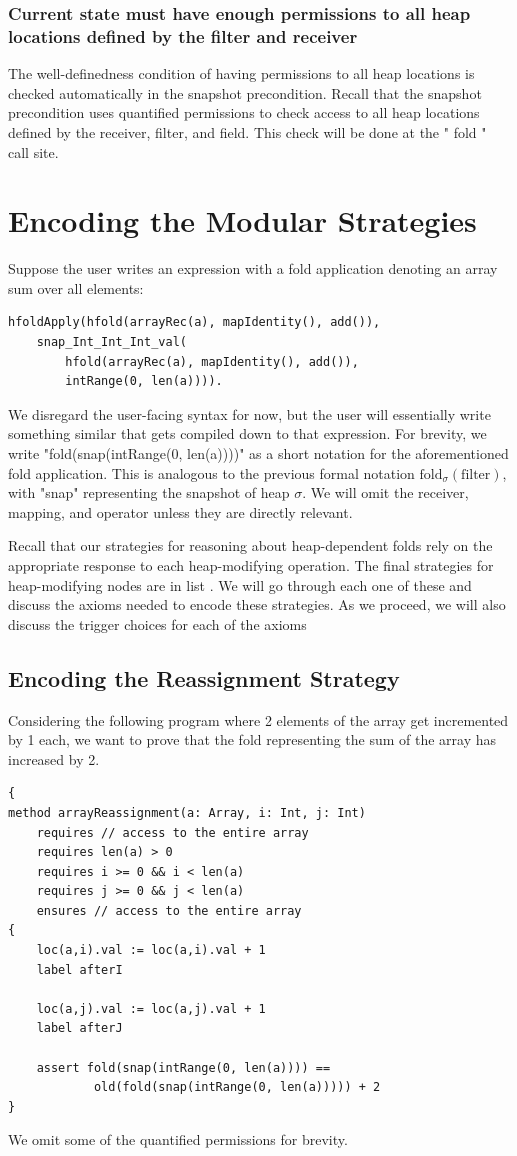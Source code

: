 \documentclass[msc,oneside]{ubcthesis}
\theoremstyle{definition}
\begin{document}
\subsubsection{Current state must have enough permissions to all heap locations defined by the filter and receiver}
The well-definedness condition of having permissions to all heap locations is checked automatically in the snapshot precondition. Recall that the snapshot precondition uses quantified permissions to check access to all heap locations defined by the receiver, filter, and field. This check will be done at the " fold " call site.

\section{Encoding the Modular Strategies}
Suppose the user writes an expression with a fold application denoting an array sum over all elements: 
\begin{lstlisting}
hfoldApply(hfold(arrayRec(a), mapIdentity(), add()),
    snap_Int_Int_Int_val(
        hfold(arrayRec(a), mapIdentity(), add()), 
        intRange(0, len(a)))).
\end{lstlisting}
We disregard the user-facing syntax for now, but the user will essentially write something similar that gets compiled down to that expression. For brevity, we write "fold(snap(intRange(0, len(a))))" as a short notation for the aforementioned fold application. This is analogous to the previous formal notation $\textrm{fold}_\sigma(\textrm{filter})$, with "snap" representing the snapshot of heap $\sigma$.  We will omit the receiver, mapping, and operator unless they are directly relevant. 

Recall that our strategies for reasoning about heap-dependent folds rely on the appropriate response to each heap-modifying operation. The final strategies for heap-modifying nodes are in list .
We will go through each one of these and discuss the axioms needed to encode these strategies. As we proceed, we will also discuss the trigger choices for each of the axioms

\subsection{Encoding the Reassignment Strategy}
Considering the following program where 2 elements of the array get incremented by 1 each, we want to prove that the fold representing the sum of the array has increased by 2.
\begin{lstlisting}
{
method arrayReassignment(a: Array, i: Int, j: Int) 
    requires // access to the entire array
    requires len(a) > 0
    requires i >= 0 && i < len(a)
    requires j >= 0 && j < len(a)
    ensures // access to the entire array
{
    loc(a,i).val := loc(a,i).val + 1
    label afterI

    loc(a,j).val := loc(a,j).val + 1
    label afterJ    
    
    assert fold(snap(intRange(0, len(a)))) == 
            old(fold(snap(intRange(0, len(a))))) + 2
}
\end{lstlisting}
We omit some of the quantified permissions for brevity.
\end{document}
